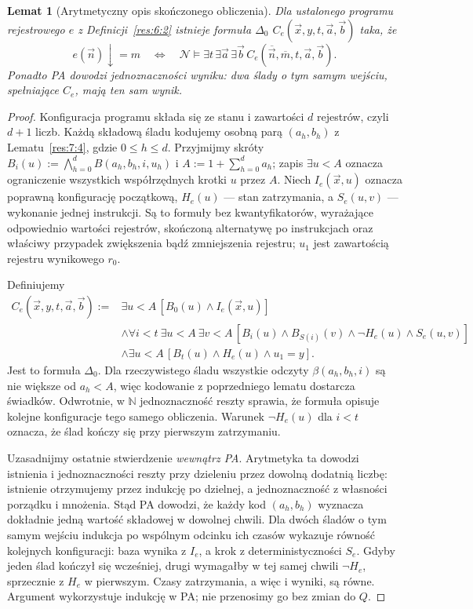 \documentclass[11pt,a4paper]{article}
\numberwithin{equation}{section}
\newcommand{\N}{\mathbb N}
\theoremstyle{plain}
\newtheorem{lemat}[twierdzenie]{Lemat}
\theoremstyle{definition}
\theoremstyle{remark}
\begin{document}
\begin{lemat}[Arytmetyczny opis skończonego obliczenia]\label{res:7:5}
Dla ustalonego programu rejestrowego $e$ z Definicji~\ref{res:6:2} istnieje formuła $\Delta_0$ $C_e(\vec x,y,t,\vec a,\vec b)$ taka, że
\[
e(\vec n)\downarrow=m\quad\Longleftrightarrow\quad
\mathcal N\models\exists t\,\exists\vec a\,\exists\vec b\,
C_e(\overline{\vec n},\overline m,t,\vec a,\vec b).
\]
Ponadto PA dowodzi jednoznaczności wyniku: dwa ślady o tym samym wejściu, spełniające $C_e$, mają ten sam wynik.
\end{lemat}
\begin{proof}
Konfiguracja programu składa się ze stanu i zawartości $d$ rejestrów, czyli $d+1$ liczb. Każdą składową śladu kodujemy osobną parą $(a_h,b_h)$ z Lematu~\ref{res:7:4}, gdzie $0\le h\le d$. Przyjmijmy skróty
$B_i(u):=\bigwedge_{h=0}^d B(a_h,b_h,i,u_h)$ i
$A:=1+\sum_{h=0}^d a_h$; zapis $\exists u<A$ oznacza ograniczenie wszystkich współrzędnych krotki $u$ przez $A$.
Niech $I_e(\vec x,u)$ oznacza poprawną konfigurację początkową, $H_e(u)$ --- stan zatrzymania, a $S_e(u,v)$ --- wykonanie jednej instrukcji. Są to formuły bez kwantyfikatorów, wyrażające odpowiednio wartości rejestrów, skończoną alternatywę po instrukcjach oraz właściwy przypadek zwiększenia bądź zmniejszenia rejestru; $u_1$ jest zawartością rejestru wynikowego $r_0$.

Definiujemy
\begin{align*}
C_e(\vec x,y,t,\vec a,\vec b):={}&
\exists u<A\,[B_0(u)\land I_e(\vec x,u)]\\
&\land\forall i<t\ \exists u<A\ \exists v<A\,
[B_i(u)\land B_{S(i)}(v)\land\neg H_e(u)\land S_e(u,v)]\\
&\land\exists u<A\,[B_t(u)\land H_e(u)\land u_1=y].
\end{align*}
Jest to formuła $\Delta_0$. Dla rzeczywistego śladu wszystkie odczyty $\beta(a_h,b_h,i)$ są nie większe od $a_h<A$, więc kodowanie z poprzedniego lematu dostarcza świadków. Odwrotnie, w $\N$ jednoznaczność reszty sprawia, że formuła opisuje kolejne konfiguracje tego samego obliczenia. Warunek $\neg H_e(u)$ dla $i<t$ oznacza, że ślad kończy się przy pierwszym zatrzymaniu.

Uzasadnijmy ostatnie stwierdzenie \emph{wewnątrz PA}. Arytmetyka ta dowodzi istnienia i jednoznaczności reszty przy dzieleniu przez dowolną dodatnią liczbę: istnienie otrzymujemy przez indukcję po dzielnej, a jednoznaczność z własności porządku i mnożenia. Stąd PA dowodzi, że każdy kod $(a_h,b_h)$ wyznacza dokładnie jedną wartość składowej w dowolnej chwili. Dla dwóch śladów o tym samym wejściu indukcja po wspólnym odcinku ich czasów wykazuje równość kolejnych konfiguracji: baza wynika z $I_e$, a krok z deterministyczności $S_e$. Gdyby jeden ślad kończył się wcześniej, drugi wymagałby w tej samej chwili $\neg H_e$, sprzecznie z $H_e$ w pierwszym. Czasy zatrzymania, a więc i wyniki, są równe. Argument wykorzystuje indukcję w PA; nie przenosimy go bez zmian do $Q$.
\end{proof}
\end{document}
